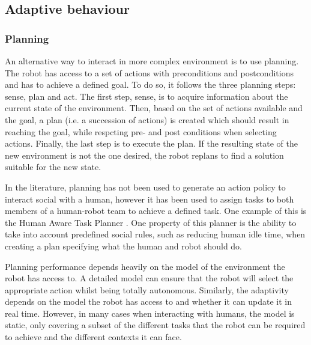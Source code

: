\subsection{Adaptive behaviour}

\subsubsection{Planning} \label{subsec:planning}

    An alternative way to interact in more complex environment is to use
    planning. The robot has access to a set of actions with preconditions and
    postconditions and has to achieve a defined goal. To do so, it follows the
    three planning steps: sense, plan and act. The first step, sense, is to
    acquire information about the current state of the environment. Then,  based
    on the set of actions available and the goal, a plan (i.e. a succession of
    actions) is created which should result in reaching the goal, while
    respcting pre- and post conditions when selecting actions. Finally, the last
    step is to execute the plan. If the resulting state of the new environment
    is not the one desired, the robot replans to find a solution suitable for
    the new state.


    In the literature, planning has not been used to generate an action policy
    to interact social with a human, however it has been used to assign tasks to
    both members of a human-robot team to achieve a defined task. One example of
    this is the Human Aware Task Planner \citep{alili2009task}. One property of
    this planner is the ability to take into account predefined social rules,
    such as reducing human idle time, when creating a plan specifying what the
    human and robot should do.

    Planning performance depends heavily on the model of the environment the
    robot has access to. A detailed model can ensure that the robot will select
    the appropriate action whilst being totally autonomous. Similarly, the
    adaptivity depends on the model the robot has access to and whether it can
    update it in real time. However, in many cases when interacting with humans,
    the model is static, only covering a subset of the different tasks that the
    robot can be required to achieve and the different contexts it can face.

